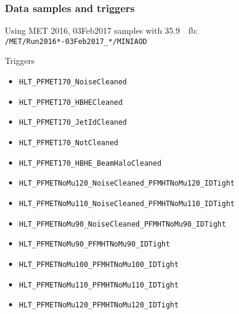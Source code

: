 \documentclass{beamer}
\begin{document}
\begin{frame}
  \frametitle{Data samples and triggers}
  Using MET 2016, 03Feb2017 samples with \SI{35.9}{\per fb}:
  \texttt{/MET/Run2016*-03Feb2017\_*/MINIAOD}

  \vspace{12pt}

  Triggers
  \begin{itemize}
  \item \texttt{HLT\_PFMET170\_NoiseCleaned}
  \item \texttt{HLT\_PFMET170\_HBHECleaned}
  \item \texttt{HLT\_PFMET170\_JetIdCleaned}
  \item \texttt{HLT\_PFMET170\_NotCleaned}
  \item \texttt{HLT\_PFMET170\_HBHE\_BeamHaloCleaned}
  \item \texttt{HLT\_PFMETNoMu120\_NoiseCleaned\_PFMHTNoMu120\_IDTight}
  \item \texttt{HLT\_PFMETNoMu110\_NoiseCleaned\_PFMHTNoMu110\_IDTight}
  \item \texttt{HLT\_PFMETNoMu90\_NoiseCleaned\_PFMHTNoMu90\_IDTight}
  \item \texttt{HLT\_PFMETNoMu90\_PFMHTNoMu90\_IDTight}
  \item \texttt{HLT\_PFMETNoMu100\_PFMHTNoMu100\_IDTight}
  \item \texttt{HLT\_PFMETNoMu110\_PFMHTNoMu110\_IDTight}
  \item \texttt{HLT\_PFMETNoMu120\_PFMHTNoMu120\_IDTight}
  \end{itemize}

\end{frame}
\end{document}
